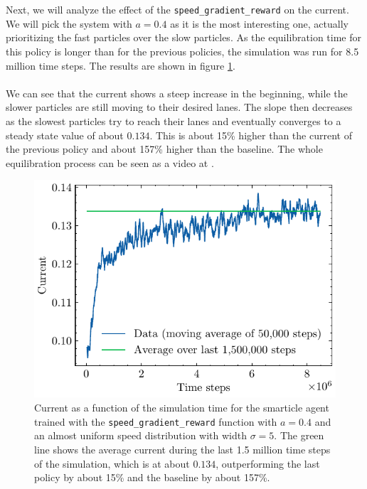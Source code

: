 \\
\\
Next, we will analyze the effect of the \texttt{speed\_gradient\_reward} on the current. We will pick the system with $a=0.4$ as it is the most interesting one, actually prioritizing the fast particles over the slow particles. As the equilibration time for this policy is longer than for the previous policies, the simulation was run for 8.5 million time steps. The results are shown in figure \ref{fig:speed_grad_current}. 
\\
\\
We can see that the current shows a steep increase in the beginning, while the slower particles are still moving to their desired lanes. The slope then decreases as the slowest particles try to reach their lanes and eventually converges to a steady state value of about $0.134$. This is about 15\% higher than the current of the previous policy and about 157\% higher than the baseline. The whole equilibration process can be seen as a video at \cite{maertens_smarticle_lane_vid}.

\begin{figure}[H]
    \centering
    \includegraphics{speed_grad_current.pdf}
    \caption{Current as a function of the simulation time for the smarticle agent trained with the \texttt{speed\_gradient\_reward} function with $a=0.4$ and an almost uniform speed distribution with width $\sigma=5$. The green line shows the average current during the last 1.5 million time steps of the simulation, which is at about $0.134$, outperforming the last policy by about 15\% and the baseline by about 157\%.}
    \label{fig:speed_grad_current}
\end{figure}

